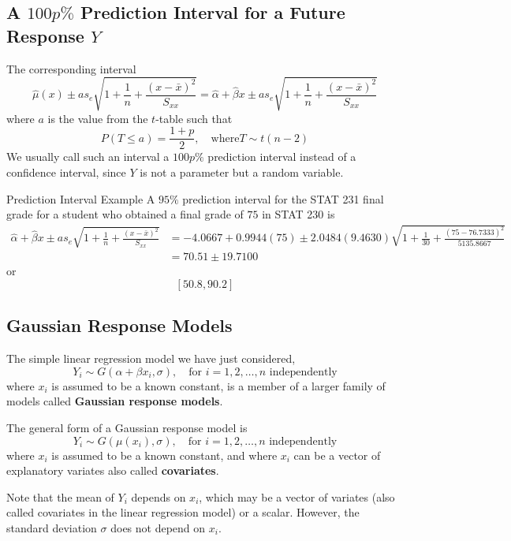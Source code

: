 \subsection{A $ 100p\% $ Prediction Interval for a Future Response $ Y $}
The corresponding interval
\[\hat{\mu}(x) \pm a s_{e} \sqrt{1+\frac{1}{n}+\frac{(x-\bar{x})^{2}}{S_{x x}}}=\hat{\alpha}+\hat{\beta} x \pm a s_{e} \sqrt{1+\frac{1}{n}+\frac{(x-\bar{x})^{2}}{S_{x x}}}\]
where $ a $ is the value from the $ t $-table such that
\[P(T \leq a)=\frac{1+p}{2}, \quad \text{where} T \sim t(n-2)\]
We usually call such an interval a $ 100p\% $ prediction interval instead of a confidence interval,
since $ Y $ is not a parameter but a random variable.


\begin{Example}{Prediction Interval Example}{}
    A $ 95\% $ prediction interval for the STAT 231 final grade for a student who obtained
    a final grade of $ 75 $ in STAT 230 is
    \begin{align*}
        \hat{\alpha}+\hat{\beta} x \pm a s_{e} \sqrt{1+\frac{1}{n}+\frac{(x-\bar{x})^{2}}{S_{x x}}}
         & =-4.0667+0.9944(75) \pm 2.0484(9.4630) \sqrt{1+\frac{1}{30}+\frac{(75-76.7333)^{2}}{5135.8667}} \\
         & =70.51 \pm 19.7100
    \end{align*}
    or
    \[ \left[ 50.8,90.2 \right] \]
\end{Example}


\subsection{Gaussian Response Models}
The simple linear regression model we have just considered,
\[ Y_i \sim G(\alpha+\beta x_i,\sigma),\quad \text{for } i=1,2, \ldots, n \text{ independently} \]
where $ x_i $ is assumed to be a known constant, is a member of a larger family of models
called \textbf{Gaussian response models}.

The general form of a Gaussian response model is
\[Y_{i} \sim G\left(\mu\left(x_{i}\right), \sigma\right), \quad \text{for } i=1,2, \ldots, n \text{ independently}\]
where $ x_i $ is assumed to be a known constant, and where $ x_i $ can be a vector of explanatory
variates also called \textbf{covariates}.

Note that the mean of $ Y_i $ depends on $ x_i $, which may be a vector of variates (also called
covariates in the linear regression model) or a scalar. However, the standard deviation $ \sigma $
does not depend on $ x_i $.

